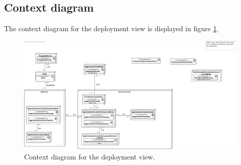 

\begin{landscape}
    \section{Context diagram}
    The context diagram for the deployment view is displayed in figure \ref{fig:depl_context}. \\

    \centering
    \vspace*{\fill}

        \begin{figure}[!htp]
        	\centering
            \includegraphics[width=\textwidth]{images/deployment-context}
            \caption{Context diagram for the deployment view.}\label{fig:depl_context}
        \end{figure}

    \vfill
\end{landscape}



